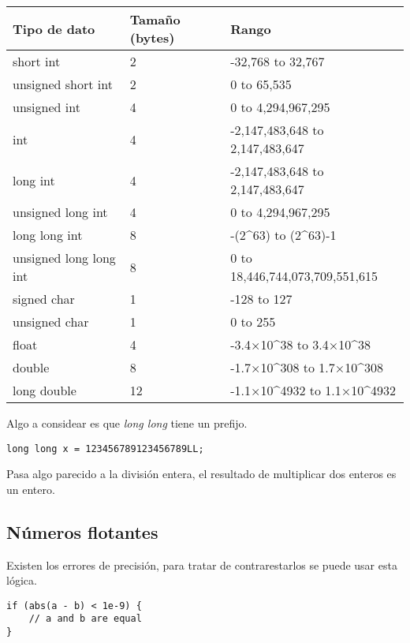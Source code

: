 \documentclass[11pt]{article}
\begin{document}
\begin{center}
    \begin{tabular}{ |l|l|l| }
         \hline
         Tipo de dato & Tamaño (bytes) & Rango \\
         \hline
         short int & 2 & -32,768 to 32,767 \\
         unsigned short int & 2 & 0 to 65,535 \\
         unsigned int & 4 & 0 to 4,294,967,295 \\
         int & 4 & -2,147,483,648 to 2,147,483,647 \\
         long int & 4 & -2,147,483,648 to 2,147,483,647 \\
         unsigned long int & 4 & 0 to 4,294,967,295 \\
         long long int & 8 & -(2\textasciicircum63) to (2\textasciicircum63)-1 \\
         unsigned long long int  & 8 & 0 to 18,446,744,073,709,551,615 \\
         signed char & 1 & -128 to 127 \\
         unsigned char & 1 & 0 to 255 \\
         float & 4 & -3.4×10\textasciicircum38 to 3.4×10\textasciicircum38 \\
         double & 8 & -1.7×10\textasciicircum308 to 1.7×10\textasciicircum308 \\
         long double & 12 & -1.1×10\textasciicircum4932 to 1.1×10\textasciicircum4932 \\
         \hline
    \end{tabular}
\end{center}

Algo a considear es que \textit{long long} tiene un prefijo.

\begin{lstlisting}
long long x = 123456789123456789LL;
\end{lstlisting}

Pasa algo parecido a la división entera, el resultado de multiplicar dos enteros es un entero. 

\subsection{Números flotantes}

Existen los errores de precisión, para tratar de contrarestarlos se puede usar esta lógica.
\begin{lstlisting}
if (abs(a - b) < 1e-9) {
    // a and b are equal
}
\end{lstlisting}
\end{document}
